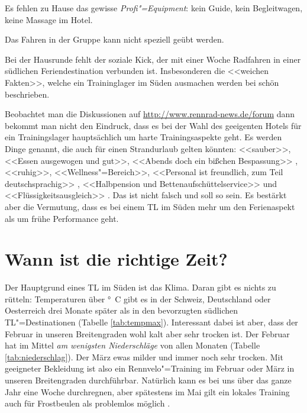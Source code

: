 \documentclass[a4paper,DIV13,BCOR0cm,draft=TRUE]{scrartcl}
\newcommand{\rv}{Rennvelo}
\begin{document}
Es fehlen zu Hause das gewisse \emph{Profi"=Equipment}: kein Guide, kein Begleitwagen, keine Massage im Hotel.

Das Fahren in der Gruppe kann nicht speziell geübt werden.

Bei der Hausrunde fehlt der soziale Kick, der mit einer Woche Radfahren in einer südlichen Feriendestination verbunden ist.
Insbesonderen die <<weichen Fakten>>, welche ein Traininglager im Süden ausmachen werden bei 
schön beschrieben.

Beobachtet man die Diskussionen auf \url{http://www.rennrad-news.de/forum} dann bekommt man nicht den Eindruck,
dass es bei der Wahl des geeigenten Hotels für ein Trainingslager hauptsächlich um harte Trainingsaspekte geht.
Es werden Dinge genannt, die auch für einen Strandurlaub gelten könnten:
<<sauber>>, <<Essen ausgewogen und gut>>, <<Abends doch ein bißchen Bespassung>> \cite{tka19762010hotel},
<<ruhig>>, <<Wellness"=Bereich>>, <<Personal ist freundlich, zum Teil deutschsprachig>> \cite{garfield22011hotel},
<<Halbpension und Bettenaufschüttelservice>> und <<Flüssigkeitsausgleich>> \cite{orteb2011hotel}.
Das ist nicht falsch und soll so sein. Es bestärkt aber die Vermutung, dass es bei einem TL im Süden mehr 
um den Ferienaspekt als um frühe Performance geht.

\section{Wann ist die richtige Zeit?}
\label{sec:richtigezeit}

Der Hauptgrund eines TL im Süden ist das Klima.
Daran gibt es nichts zu rütteln: Temperaturen über \unit[10]{\degree C} gibt es in der Schweiz, Deutschland oder Oesterreich
drei Monate später als in den bevorzugten südlichen TL"=Destinationen (Tabelle \ref{tab:tempmax}).
Interessant dabei ist aber, dass der Februar in unseren Breitengraden
wohl kalt aber sehr trocken ist.
Der Februar hat im Mittel \textit{am wenigsten Niederschläge} von allen Monaten (Tabelle \ref{tab:niederschlag}).
Der März ewas milder und immer noch sehr trocken.
Mit geeigneter Bekleidung ist also ein \rv"=Training im Februar oder März
in unseren Breitengraden durchführbar.
Natürlich kann es bei uns über das ganze Jahr eine Woche durchregnen, aber spätestens im Mai gilt ein
lokales Training auch für Frostbeulen als problemlos möglich \cite{capricorn2015ausland,raimi272015wetter}.
\end{document}

